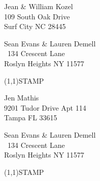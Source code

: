 \documentclass[12pt]{article}
\begin{document}
\begin{center} \begin{Huge} \vspace*{\fill}
Jean \& William Kozel\\
109 South Oak Drive\\
Surf City NC 28445\\
\vspace{\fill} \end{Huge} \end{center}

\clearpage

\begin{minipage}{.5\linewidth} \noindent
Sean Evans \& Lauren Demell\\\ 
134 Crescent Lane\\ 
Roslyn Heights NY 11577
\end{minipage}
\begin{minipage}{.5\linewidth \hspace{-.2in} \vspace{-.3in}}
\begin{flushright}
\framebox(1,1){STAMP}
\end{flushright}
\end{minipage}

\begin{center} \begin{Huge} \vspace*{\fill}
Jen Mathis\\
9201 Tudor Drive Apt 114\\
Tampa FL 33615\\
\vspace{\fill} \end{Huge} \end{center}

\clearpage

\begin{minipage}{.5\linewidth} \noindent
Sean Evans \& Lauren Demell\\\ 
134 Crescent Lane\\ 
Roslyn Heights NY 11577
\end{minipage}
\begin{minipage}{.5\linewidth \hspace{-.2in} \vspace{-.3in}}
\begin{flushright}
\framebox(1,1){STAMP}
\end{flushright}
\end{minipage}
\end{document}
